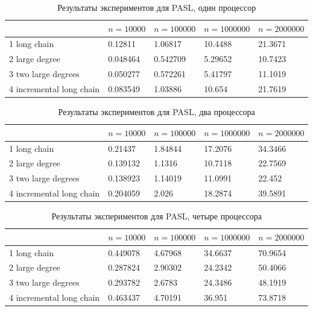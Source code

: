\documentclass[specification,annotation]{itmo-student-thesis}
\begin{document}
\begin{table}[!ht]
\centering
\begin{tabular}{|l|l|l|l|l|}\hline
 & $n=10000$ & $n=100000$ & $n=1000000$ & $n=2000000$ \\\hline
1 long chain & 0.12811 & 1.06817 & 10.4488 & 21.3671 \\\hline
2 large degree & 0.048464 & 0.542709 & 5.29652 & 10.7423 \\\hline
3 two large degrees & 0.050277 & 0.572261 & 5.41797 & 11.1019 \\\hline
4 incremental long chain & 0.083549 & 1.03886 & 10.654 & 21.7619 \\\hline
\end{tabular}
\caption{Результаты экспериментов для PASL, один процессор}\label{tbl:results-pasl-1}
\end{table}

\begin{table}[!ht]
\centering
\begin{tabular}{|l|l|l|l|l|}\hline
 & $n=10000$ & $n=100000$ & $n=1000000$ & $n=2000000$ \\\hline
1 long chain & 0.21437 & 1.84844 & 17.2076 & 34.3466 \\\hline
2 large degree & 0.139132 & 1.1316 & 10.7118 & 22.7569 \\\hline
3 two large degrees & 0.138923 & 1.14019 & 11.0991 & 22.452 \\\hline
4 incremental long chain & 0.204059 & 2.026 & 18.2874 & 39.5891 \\\hline
\end{tabular}
\caption{Результаты экспериментов для PASL, два процессора}\label{tbl:results-pasl-2}
\end{table}

\begin{table}[!ht]
\centering
\begin{tabular}{|l|l|l|l|l|}\hline
 & $n=10000$ & $n=100000$ & $n=1000000$ & $n=2000000$ \\\hline
1 long chain & 0.449078 & 4.67968 & 34.6637 & 70.9654 \\\hline
2 large degree & 0.287824 & 2.90302 & 24.2342 & 50.4066 \\\hline
3 two large degrees & 0.293782 & 2.6783 & 24.3486 & 48.1919 \\\hline
4 incremental long chain & 0.463437 & 4.70191 & 36.951 & 73.8718 \\\hline
\end{tabular}
\caption{Результаты экспериментов для PASL, четыре процессора}\label{tbl:results-pasl-4}
\end{table}
\end{document}
